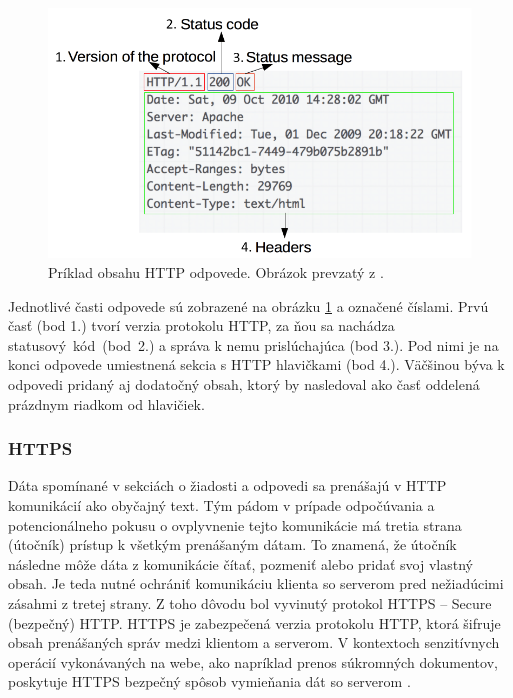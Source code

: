 \begin{figure}[htb!]
\begin{center}
    \includegraphics[scale=0.6]{obrazky-figures/http_response.png}
    \caption{Príklad obsahu HTTP odpovede. Obrázok prevzatý z \cite{mdn-docs-http-overview}.}
    \label{fig:http-response}
\end{center}
\end{figure}

Jednotlivé časti odpovede sú zobrazené na obrázku \ref{fig:http-response} a označené číslami. 
Prvú časť (bod 1.) tvorí verzia protokolu HTTP, za ňou sa nachádza \mbox{statusový kód (bod 2.)} a správa k nemu prislúchajúca (bod 3.). 
Pod nimi je na konci odpovede umiestnená sekcia s HTTP hlavičkami (bod 4.). 
Väčšinou býva k odpovedi pridaný aj dodatočný obsah, ktorý by nasledoval ako časť oddelená prázdnym riadkom od hlavičiek.

\subsubsection{HTTPS}

Dáta spomínané v sekciách o žiadosti a odpovedi sa prenášajú v HTTP komunikácií ako obyčajný text. 
Tým pádom v prípade odpočúvania a potencionálneho pokusu o ovplyvnenie tejto komunikácie má tretia strana (útočník) prístup k všetkým prenášaným dátam. 
To znamená, že útočník následne môže dáta z komunikácie čítať, pozmeniť alebo pridať svoj vlastný obsah. 
Je teda nutné ochrániť komunikáciu klienta so serverom pred nežiadúcimi zásahmi z tretej strany. 
Z toho dôvodu bol vyvinutý protokol HTTPS -- Secure (bezpečný) HTTP.
HTTPS je zabezpečená verzia protokolu HTTP, ktorá šifruje obsah prenášaných správ medzi klientom a serverom.
V kontextoch senzitívnych operácií vykonávaných na webe, ako napríklad prenos súkromných dokumentov, poskytuje HTTPS bezpečný spôsob vymieňania dát so serverom \cite{cloudflare-http-not-secure}.


